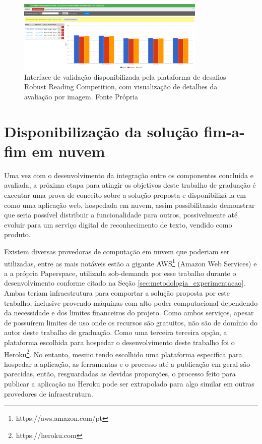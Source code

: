 \begin{figure}
    \centering
    \includegraphics[width=0.8\textwidth]{figs/metodologia-interface-validacao.png}
    \caption{Interface de validação disponibilizada pela plataforma de desafios Robust Reading Competition, com visualização de detalhes da avaliação por imagem. Fonte Própria}
    \label{fig:methodology_validation_interface_details}
\end{figure}

\section{Disponibilização da solução fim-a-fim em nuvem}\label{sec:methodology_cloud_deploy}
Uma vez com o desenvolvimento da integração entre os componentes concluída e avaliada, a próxima etapa para atingir os objetivos deste trabalho de graduação é executar uma prova de conceito sobre a solução proposta e disponibilizá-la em como uma aplicação web, hospedada em nuvem, assim possibilitando demonstrar que seria possível distribuir a funcionalidade para outros, possivelmente até evoluir para um serviço digital de reconhecimento de texto, vendido como produto.

Existem diversas provedoras de computação em nuvem que poderiam ser utilizadas, entre as mais notáveis estão a gigante AWS\footnote{https://aws.amazon.com/pt} (Amazon Web Services) e a a própria Paperspace, utilizada sob-demanda por esse trabalho durante o desenvolvimento conforme citado na Seção \ref{sec:metodologia_experimentacao}. Ambas teriam infraestrutura para comportar a solução proposta por este trabalho, inclusive provendo máquinas com alto poder computacional dependendo da necessidade e dos limites financeiros do projeto. Como ambos serviços, apesar de possuírem limites de uso onde os recursos são gratuitos, não são de domínio do autor deste trabalho de graduação. Como uma terceira terceira opção, a plataforma escolhida para hospedar o desenvolvimento deste trabalho foi o Heroku\footnote{https://heroku.com}. No entanto, mesmo tendo escolhido uma plataforma especifica para hospedar a aplicação, as ferramentas e o processo até a publicação em geral são parecidas, então, resguardadas as devidas proporções, o processo feito para publicar a aplicação no Heroku pode ser extrapolado para algo similar em outras provedores de infraestrutura.

